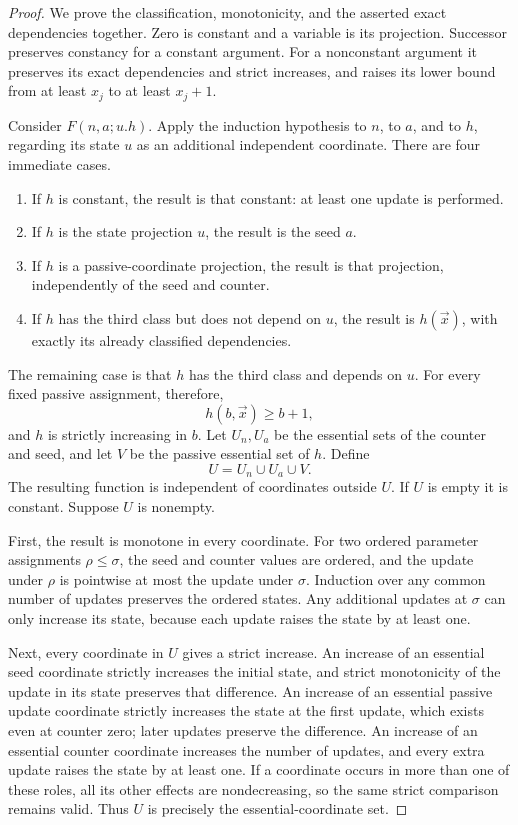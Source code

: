 \begin{proof}
We prove the classification, monotonicity, and the asserted exact
dependencies together. Zero is constant and a variable is its projection.
Successor preserves constancy for a constant argument. For a nonconstant
argument it preserves its exact dependencies and strict increases, and
raises its lower bound from at least $x_j$ to at least $x_j+1$.

Consider $F(n,a;u.h)$. Apply the induction hypothesis to $n$, to $a$, and
to $h$, regarding its state $u$ as an additional independent coordinate.
There are four immediate cases.
\begin{enumerate}
\item If $h$ is constant, the result is that constant: at least one
      update is performed.
\item If $h$ is the state projection $u$, the result is the seed $a$.
\item If $h$ is a passive-coordinate projection, the result is that
      projection, independently of the seed and counter.
\item If $h$ has the third class but does not depend on $u$, the result
      is $h(\vec x)$, with exactly its already classified dependencies.
\end{enumerate}
The remaining case is that $h$ has the third class and depends on $u$.
For every fixed passive assignment, therefore,
\[
                 h(b,\vec x)\geq b+1,
\]
and $h$ is strictly increasing in $b$. Let $U_n,U_a$ be the essential
sets of the counter and seed, and let $V$ be the passive essential set of
$h$. Define
\[
                         U=U_n\cup U_a\cup V.
\]
The resulting function is independent of coordinates outside $U$.
If $U$ is empty it is constant. Suppose $U$ is nonempty.

First, the result is monotone in every coordinate. For two ordered
parameter assignments $\rho\leq\sigma$, the seed and counter values
are ordered, and the update under $\rho$ is pointwise at most the update
under $\sigma$. Induction over any common number of updates preserves
the ordered states. Any additional updates at $\sigma$ can only increase
its state, because each update raises the state by at least one.

Next, every coordinate in $U$ gives a strict increase. An increase of
an essential seed coordinate strictly increases the initial state, and
strict monotonicity of the update in its state preserves that difference.
An increase of an essential passive update coordinate strictly increases
the state at the first update, which exists even at counter zero; later
updates preserve the difference. An increase of an essential counter
coordinate increases the number of updates, and every extra update
raises the state by at least one. If a coordinate occurs in more than
one of these roles, all its other effects are nondecreasing, so the
same strict comparison remains valid. Thus $U$ is precisely the
essential-coordinate set.


\end{proof}
